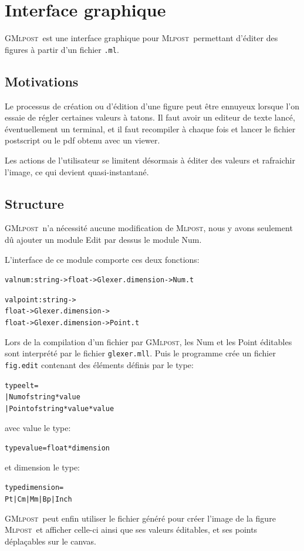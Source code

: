 \documentclass[a4paper,12pt]{article}
\newcommand{\mlpost}{\textsc{Mlpost}}
\newcommand{\gmlpost}{\textsc{GMlpost}}
\begin{document}
\section{Interface graphique}
\gmlpost\ est une interface graphique pour \mlpost\ permettant d'éditer des figures à partir d'un fichier \texttt{.ml}. 
\subsection{Motivations}
Le processus de création ou d'édition d'une figure peut être ennuyeux lorsque l'on essaie de régler certaines valeurs à tatons. Il faut avoir un editeur de texte lancé, éventuellement un terminal, et il faut recompiler à chaque fois et lancer le fichier postscript ou le pdf obtenu avec un viewer.

Les actions de l'utilisateur se limitent désormais à éditer des valeurs et rafraichir l'image, ce qui devient quasi-instantané.
\subsection{Structure}
\gmlpost\ n'a nécessité aucune modification de \mlpost, nous y avons seulement dû ajouter un module Edit par dessus le module Num.

L'interface de ce module comporte ces deux fonctions:
\begin{alltt}
  val num: string -> float -> Glexer.dimension -> Num.t

  val point: string -> 
  float -> Glexer.dimension -> 
  float -> Glexer.dimension -> Point.t
\end{alltt}

Lors de la compilation d'un fichier par \gmlpost, les Num et les Point éditables sont interprété par le fichier \texttt{glexer.mll}. Puis le programme crée un fichier \texttt{fig.edit} contenant des éléments définis par le type:
\begin{alltt}
  type elt = 
  | Num of string * value
  | Point of string * value * value
\end{alltt}
avec value le type:
\begin{alltt}
  type value = float * dimension
\end{alltt}
et dimension le type:
\begin{alltt}
  type dimension =
  Pt | Cm | Mm | Bp | Inch
\end{alltt}

\gmlpost\ peut enfin utiliser le fichier généré pour créer l'image de la figure \mlpost\ et afficher celle-ci ainsi que ses valeurs éditables, et ses points déplaçables sur le canvas.
\end{document}
